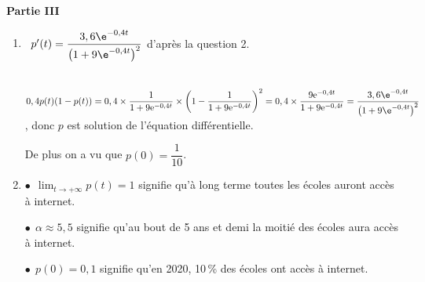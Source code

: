 \bigskip

\textbf{Partie III}

\medskip

\begin{enumerate}
\item %


\starredbullet~$p'(t) = \dfrac{3,6\e^{-0,4t}}{\left(1 + 9\e^{-0,4t} \right)^2}$ d'après la question 2.

\starredbullet~$0,4p(t)(1 - p(t)) = 0,4 \times \dfrac{1}{1 + 9\text{e}^{-0,4t}} \times \left(1 - \dfrac{1}{1 + 9\text{e}^{-0,4t}} \right)^2 = 0,4\times \dfrac{9\text{e}^{-0,4t}}{1 + 9\text{e}^{-0,4t}} = \dfrac{3,6\e^{-0,4t}}{\left(1 + 9\e^{-0,4t} \right)^2}$, donc $p$ est solution de l'équation différentielle.

De plus on a vu que $p(0) = \dfrac{1}{10}$.
\item %

%
%
%
$\bullet~~$$\displaystyle\lim_{t \to + \infty} p(t) = 1$ signifie qu'à long terme toutes les écoles auront accès à internet.

$\bullet~~$$\alpha \approx 5,5$ signifie qu'au bout de 5 ans et demi la moitié des écoles aura accès à internet.

$\bullet~~$$p(0) = 0,1$ signifie qu'en 2020, 10\,\% des écoles ont accès à internet.
\end{enumerate}

